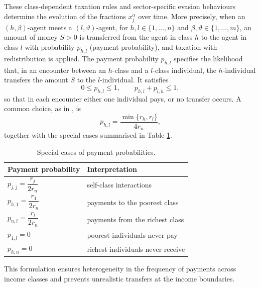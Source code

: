 \documentclass[11pt]{article}
\theoremstyle{plain}
\theoremstyle{definition}
\newcommand{\1}{\mathbf{1}}
\begin{document}
These class-dependent taxation rules and sector-specific evasion behaviours determine the evolution of the fractions $x_j^\alpha$ over time. More precisely, when an $(h,\beta)$-agent meets a $(l,\vartheta)$-agent, for \mbox{$h,l \in \{1,\ldots,n\}$} and $\beta,\vartheta\in \{1,\ldots,m\}$, an amount of money $S>0$ is transferred from the agent in class $h$ to the agent in class $l$ with probability $p_{h,l}$ (payment probability), and taxation with redistribution is applied. The payment probability $p_{h,l}$ specifies the likelihood that, in an encounter
between an $h$-class and a $l$-class individual, the $h$-individual transfers the
amount $S$ to the $l$-individual. It satisfies
\begin{equation*}
0 \leq p_{h,l} \leq 1, 
\qquad p_{h,l} + p_{l,h} \leq 1 ,    
\end{equation*}
so that in each encounter either one individual pays, or no transfer occurs.
A common choice, as in \cite{bertotti2018mathematical}, is
\begin{equation}
 p_{h,l} = \frac{\min\{r_h,r_l\}}{4r_n}, 
 \label{paym_prob}
\end{equation}
together with the special cases summarised in Table \ref{tab:paymentProbs}.
\begin{table}%
\centering
\begin{tabular}{ll}
\toprule
\textbf{Payment probability} & \textbf{Interpretation} \\
\midrule
$p_{j,j} = \dfrac{r_j}{2r_n}$ & self-class interactions \\[10pt]
$p_{h,1} = \dfrac{r_1}{2r_n}$ & payments to the poorest class \\[10pt]
$p_{n,l} = \dfrac{r_l}{2r_n}$ & payments from the richest class \\[10pt]
$p_{1,l} = 0$ & poorest individuals never pay \\[10pt]
$p_{h,n} = 0$ & richest individuals never receive \\
\bottomrule
\end{tabular}
\caption{Special cases of payment probabilities.}
\label{tab:paymentProbs}
\end{table}
\medskip
This formulation ensures heterogeneity in the frequency of payments across income classes and prevents unrealistic transfers at the income boundaries.
\end{document}
